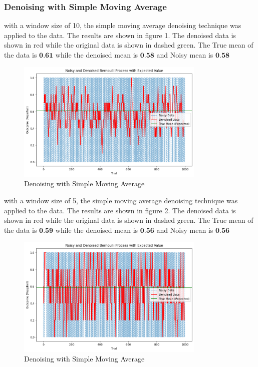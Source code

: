 \documentclass[a4paper,12pt]{article} %
\begin{document}
\subsubsection{ Denoising with Simple Moving Average}
with a window size of 10, the simple moving average denoising technique was applied to the data. The results are shown in figure 1. The denoised data is shown in red while the original data is shown in dashed green. The True mean of the data is \(\textbf{0.61}\) while the denoised mean is \(\textbf{0.58}\) and Noisy mean is \(\textbf{0.58}\)
\begin{figure}[h]
\centering
\includegraphics[width=0.8\textwidth]{simple_moving_average.png}
\caption{Denoising with Simple Moving Average}
\end{figure}
with a window size of 5, the simple moving average denoising technique was applied to the data. The results are shown in figure 2. The denoised data is shown in red while the original data is shown in dashed green. The True mean of the data is \(\textbf{0.59}\) while the denoised mean is \(\textbf{0.56}\) and Noisy mean is \(\textbf{0.56}\)
\begin{figure}[h]
\centering
\includegraphics[width=0.8\textwidth]{window_5.png}
\caption{Denoising with Simple Moving Average}
\end{figure}
\end{document}
